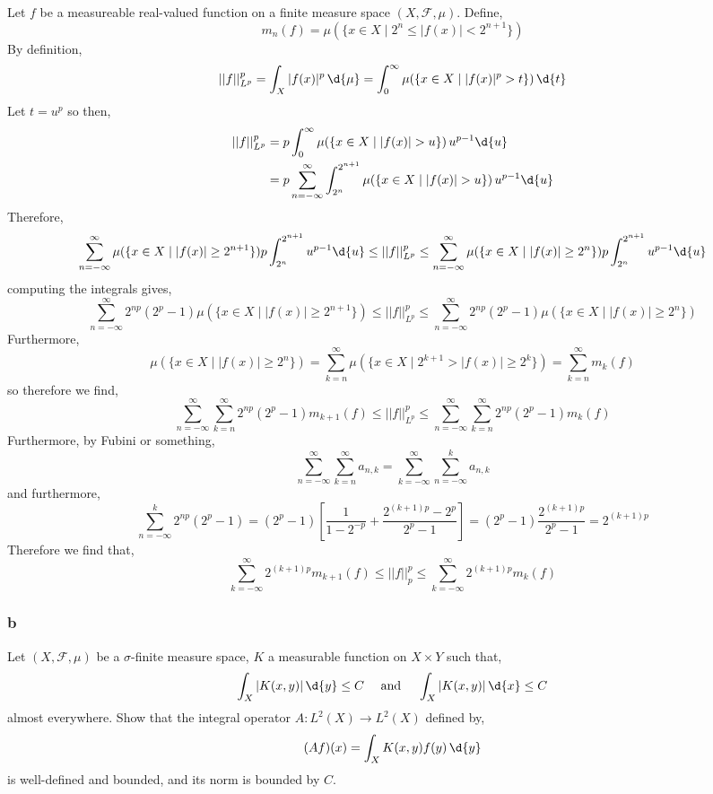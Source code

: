 \documentclass[12pt]{article}
\renewcommand{\F}{\mathcal{F}}
\begin{document}
Let $f$ be a measureable real-valued function on a finite measure space $(X, \F, \mu)$. Define,
\[ m_n(f) = \mu( \{ x \in X \mid 2^n \le |f(x)| < 2^{n+1} \} ) \]
By definition,
\[ || f ||_{L^p}^p = \int_X |f(x)|^p \, \d{\mu} = \int_0^\infty \mu( \{ x \in X \mid |f(x)|^p > t \} ) \, \d{t} \]
Let $t = u^p$ so then,
\begin{align*}
|| f ||_{L^p}^p & = p \int_0^\infty \mu( \{ x \in X \mid |f(x)| > u \} ) \, u^{p-1} \d{u}
\\
& = p \sum_{n = -\infty}^\infty \int_{2^n}^{2^{n+1}} \mu( \{ x \in X \mid |f(x)| > u \} ) \, u^{p-1} \d{u}
\end{align*}
Therefore,
\[ \sum_{n = -\infty}^\infty \mu( \{ x \in X \mid |f(x)| \ge 2^{n+1} \} ) p \int_{2^n}^{2^{n+1}} u^{p-1} \d{u} \le || f ||_{L^p}^p \le \sum_{n = -\infty}^\infty \mu( \{ x \in X \mid |f(x)| \ge 2^{n} \} ) p \int_{2^n}^{2^{n+1}} u^{p-1} \d{u} \]
computing the integrals gives,
\[ \sum_{n = -\infty}^\infty 2^{np} (2^p - 1) \mu( \{ x \in X \mid |f(x)| \ge 2^{n+1} \} ) \le || f ||_{L^p}^p \le \sum_{n = -\infty}^\infty 2^{np} (2^p - 1) \mu( \{ x \in X \mid |f(x)| \ge 2^{n} \} ) \]
Furthermore,
\[ \mu(\{ x \in X \mid |f(x)| \ge 2^n\}) = \sum_{k = n}^\infty \mu(\{ x \in X \mid 2^{k+1} > |f(x)| \ge 2^k \}) = \sum_{k = n}^\infty m_k(f) \]
so therefore we find,
\[ \sum_{n = -\infty}^\infty \sum_{k = n}^\infty 2^{np} (2^p - 1) m_{k+1}(f) \le || f ||_{L^p}^p \le \sum_{n = -\infty}^\infty \sum_{k = n}^\infty 2^{np} (2^p - 1) m_k(f) \]
Furthermore, by Fubini or something,
\[ \sum_{n = -\infty}^\infty \sum_{k = n}^\infty a_{n,k} = \sum_{k = -\infty}^\infty \sum_{n = -\infty}^k a_{n,k} \]
and furthermore,
\[ \sum_{n = -\infty}^k 2^{np} (2^p - 1)  = (2^p - 1) \left[ \frac{1}{1 - 2^{-p}} + \frac{2^{(k+1)p} - 2^p}{2^p - 1} \right] = (2^p - 1) \frac{2^{(k+1)p}}{2^p - 1} = 2^{(k+1)p} \]
Therefore we find that,
\[ \sum_{k = -\infty}^\infty 2^{(k+1)p} m_{k+1}(f) \le || f ||_p^p \le \sum_{k = -\infty}^\infty 2^{(k+1)p} m_k(f) \]

\subsubsection{b}

\begin{exercise}
Let $(X, \F, \mu)$ be a $\sigma$-finite measure space, $K$ a measurable function on $X \times Y$ such that,
\[ \int_X |K(x, y)| \, \d{y} \le C \quad \text{ and } \quad \int_X |K(x, y)| \, \d{x} \le C \]
almost everywhere. Show that the integral operator $A : L^2(X) \to L^2(X)$ defined by,
\[ (A f)(x) = \int_X K(x,y) f(y) \, \d{y} \]
is well-defined and bounded, and its norm is bounded by $C$.
\end{exercise}
\end{document}
